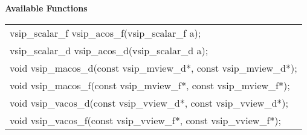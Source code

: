 \\\cvsiplh
\\ \hspace*{.8cm} \vspace*{.1cm} \textbf{Available Functions}\\
\hspace*{1.1cm} {
\ttfamily
\begin{tabular}[H]{l}
vsip\_scalar\_f vsip\_acos\_f(vsip\_scalar\_f a);\\
vsip\_scalar\_d vsip\_acos\_d(vsip\_scalar\_d a);\\
void vsip\_macos\_d(const vsip\_mview\_d*, const vsip\_mview\_d*);\\
void vsip\_macos\_f(const vsip\_mview\_f*, const vsip\_mview\_f*);\\
void vsip\_vacos\_d(const vsip\_vview\_d*, const vsip\_vview\_d*);\\
void vsip\_vacos\_f(const vsip\_vview\_f*, const vsip\_vview\_f*);\\
\end{tabular}
}
\\\pyjvsiph
{}
